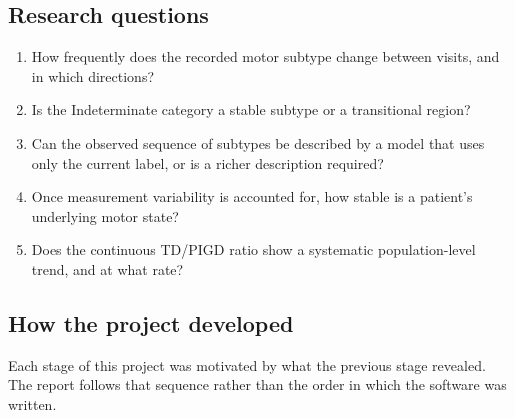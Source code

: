 \documentclass[11pt,a4paper]{article}
\begin{document}
\subsection{Research questions}

\begin{enumerate}
  \item How frequently does the recorded motor subtype change between visits,
        and in which directions?
  \item Is the Indeterminate category a stable subtype or a transitional
        region?
  \item Can the observed sequence of subtypes be described by a model that uses
        only the current label, or is a richer description required?
  \item Once measurement variability is accounted for, how stable is a
        patient's underlying motor state?
  \item Does the continuous TD/PIGD ratio show a systematic population-level
        trend, and at what rate?
\end{enumerate}

\subsection{How the project developed}

Each stage of this project was motivated by what the previous stage revealed.
The report follows that sequence rather than the order in which the software was
written.
\end{document}
